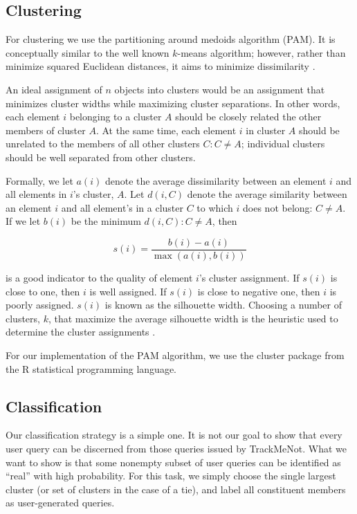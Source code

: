 \documentclass[11pt]{article}
\begin{document}
\begin{multicols}{2}
\subsection{Clustering}
\label{sec:clustering}
For clustering we use the partitioning around medoids algorithm
(PAM). It is conceptually similar to the well known $k$-means
algorithm; however, rather than minimize squared Euclidean distances,
it aims to minimize dissimilarity \cite{Kaufmann1990}. 

An ideal assignment of $n$ objects into clusters would be an assignment that minimizes cluster widths while maximizing cluster separations. In other words, each element $i$ belonging to a cluster $A$ should be closely related the other members of cluster $A$. At the same time, each element $i$ in cluster $A$ should be unrelated to the members of all other clusters $C : C \neq A$; individual clusters should be well separated from other clusters.

Formally, we let $a(i)$ denote the average dissimilarity between an element $i$ and all elements in $i$'s cluster, $A$. Let $d(i,C)$ denote the average similarity between an element $i$ and all element's in a cluster $C$ to which $i$ does not belong: $C \neq A$. If we let $b(i)$ be the minimum $d(i,C) : C \neq A$, then

\[ s(i) = \frac{b(i)-a(i)}{\max{(a(i),b(i))}} \]

is a good indicator to the quality of element $i$'s cluster assignment. If $s(i)$ is close to one, then $i$ is well assigned. If $s(i)$ is close to negative one, then $i$ is poorly assigned. $s(i)$ is known as the silhouette width. Choosing a number of clusters, $k$, that maximize the average silhouette width is the heuristic used to determine the cluster assignments \cite{Kaufmann1990}.

For our implementation of the PAM algorithm, we use the cluster
package from the R statistical programming language\cite{Rcluster}.

\subsection{Classification}
\label{sec:classification}
Our classification strategy is a simple one. It is not our goal to show that every user query can be discerned from those queries issued by TrackMeNot. What we want to show is that some nonempty subset of user queries can be identified as ``real'' with high probability. For this task, we simply choose the single largest cluster (or set of clusters in the case of a tie), and label all constituent members as user-generated queries.


\end{multicols}
\end{document}

